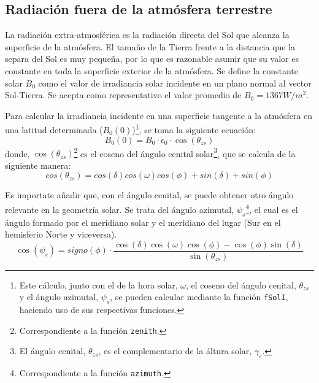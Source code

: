 \subsection{Radiación fuera de la atmósfera terrestre}
\label{sec:org59236f7}
La radiación extra-atmosférica es la radiación directa del Sol que alcanza la superficie de la atmósfera. El tamaño de la Tierra frente a la distancia que la separa del Sol es muy pequeña, por lo que es razonable asumir que su valor es constante en toda la superficie exterior de la atmósfera. Se define la constante solar \(B_0\) como el valor de irradiancia solar incidente en un plano normal al vector Sol-Tierra. Se acepta como representativo el valor promedio de \(B_0=1367W/m^2\).

Para calcular la irradiancia incidente en una superficie tangente a la atmósfera en una latitud determinada (\(B_0(0)\))\footnote{Este cálculo, junto con el de la hora solar, \(\omega\), el coseno del ángulo cenital, \(\theta_{zs}\) y  el ángulo azimutal, \(\psi_s\), se pueden calcular mediante la función \texttt{fSolI}, haciendo uso de sus respectivas funciones.}, se toma la siguiente ecuación: 
\begin{equation}
B_0(0)=B_0 \cdot \epsilon_0 \cdot \cos(\theta_{zs})
\label{eq:irradianciaextra}
\end{equation}
donde, \(\cos(\theta_{zs})\)\footnote{Correspondiente a la función \texttt{zenith}.} es el coseno del ángulo cenital solar\footnote{El ángulo cenital, \(\theta_{zs}\), es el complementario de la áltura solar, \(\gamma_s\).}, que se calcula de la siguiente manera:
\begin{equation}
cos(\theta_{zs})=cos(\delta)cos(\omega)cos(\phi)+sin(\delta)+sin(\phi)
\end{equation}

Es importate añadir que, con el ángulo cenital, se puede obtener otro ángulo relevante en la geometría solar. Se trata del ángulo azimutal, \(\psi_s\)\footnote{Correspondiente a la función \texttt{azimuth}.}, el cual es el ángulo formado por el meridiano solar y el meridiano del lugar (Sur en el hemisferio Norte y viceversa). 
\begin{equation}
\cos(\psi_s)=signo(\phi)\cdot \frac{\cos(\delta)\cos(\omega)\cos(\phi)-\cos(\phi)\sin(\delta)}{\sin(\theta_{zs})}
\end{equation}

